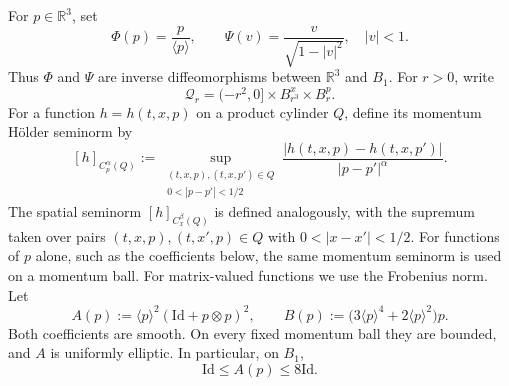 \documentclass[10pt,a4paper]{amsart}
\numberwithin{equation}{section}
\newcommand{\R}{\mathbb R}
\newcommand{\Id}{\mathrm{Id}}
\newcommand{\la}[1]{\langle #1\rangle}
\begin{document}
For $p\in\R^3$, set
\[
   \Phi(p)=\frac{p}{\la p},
   \qquad
   \Psi(v)=\frac{v}{\sqrt{1-|v|^2}},\quad |v|<1.
\]
Thus $\Phi$ and $\Psi$ are inverse diffeomorphisms between $\R^3$ and $B_1$.
For $r>0$, write
\[
   \mathcal Q_r=(-r^2,0]\times B_{r^3}^x\times B_r^p.
\]
For a function $h=h(t,x,p)$ on a product cylinder $Q$, define its momentum H\"older seminorm by
\[
   [h]_{C_p^\alpha(Q)}
   :=\sup_{\substack{(t,x,p),(t,x,p')\in Q\\0<|p-p'|<1/2}}
   \frac{|h(t,x,p)-h(t,x,p')|}{|p-p'|^\alpha}.
\]
The spatial seminorm $[h]_{C_x^\beta(Q)}$ is defined analogously, with the supremum taken over pairs $(t,x,p),(t,x',p)\in Q$ with $0<|x-x'|<1/2$.  For functions of $p$ alone, such as the coefficients below, the same momentum seminorm is used on a momentum ball.  For matrix-valued functions we use the Frobenius norm. Let
\begin{equation}\label{eq:AB-def}
   A(p):=\la p^2(\Id+p\otimes p)^2,
   \qquad
   B(p):=\bigl(3\la p^4+2\la p^2\bigr)p.
\end{equation}
Both coefficients are smooth.  On every fixed momentum ball they are bounded, and $A$ is uniformly elliptic.  In particular, on $B_1$,
\[
   \Id\le A(p)\le 8\Id.
\]
\end{document}
